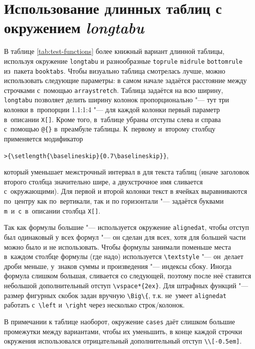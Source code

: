 \section{Использование длинных таблиц с окружением \textit{longtabu}}\label{app:B2a}

В таблице \cref{tab:test-functions} более книжный вариант
длинной таблицы, используя окружение \verb!longtabu! и разнообразные
\verb!toprule! \verb!midrule! \verb!bottomrule! из~пакета
\verb!booktabs!. Чтобы визуально таблица смотрелась лучше, можно
использовать следующие параметры: в самом начале задаётся расстояние
между строчками с~помощью \verb!arraystretch!. Таблица задаётся на
всю ширину, \verb!longtabu! позволяет делить ширину колонок
пропорционально "--- тут три колонки в~пропорции 1.1:1:4 "--- для каждой
колонки первый параметр в~описании \verb!X[]!. Кроме того, в~таблице
убраны отступы слева и справа с~помощью \verb!@{}!
в~преамбуле таблицы. К~первому и~второму столбцу применяется
модификатор

\verb!>{\setlength{\baselineskip}{0.7\baselineskip}}!,

\noindent который уменьшает межстрочный интервал в для текста таблиц (иначе
заголовок второго столбца значительно шире, а двухстрочное имя
сливается с~окружающими). Для первой и второй колонки текст в ячейках
выравниваются по~центру как по~вертикали, так и по горизонтали "---
задаётся буквами \verb!m!~и~\verb!c!~в~описании столбца \verb!X[]!.

Так как формулы большие "--- используется окружение \verb!alignedat!,
чтобы отступ был одинаковый у всех формул "--- он сделан для всех, хотя
для большей части можно было и не использовать.  Чтобы формулы
занимали поменьше места в~каждом столбце формулы (где надо)
используется \verb!\textstyle! "--- он~делает дроби меньше, у~знаков
суммы и произведения "--- индексы сбоку. Иногда формула слишком большая,
сливается со следующей, поэтому после неё ставится небольшой
дополнительный отступ \verb!\vspace*{2ex}!. Для штрафных функций "---
размер фигурных скобок задан вручную \verb!\Big\{!, т.\:к. не~умеет
\verb!alignedat! работать с~\verb!\left! и~\verb!\right! через
несколько строк/колонок.

В примечании к таблице наоборот, окружение \verb!cases! даёт слишком
большие промежутки между вариантами, чтобы их уменьшить, в конце
каждой строчки окружения использовался отрицательный дополнительный
отступ \verb!\\[-0.5em]!.

